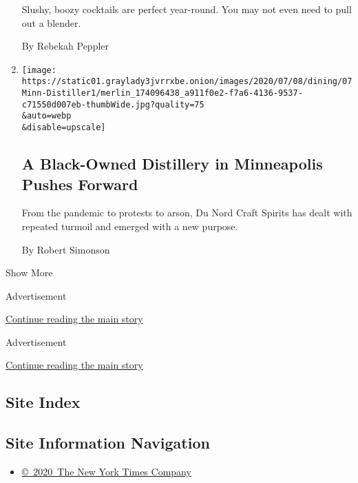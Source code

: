\begin{enumerate}
  Slushy, boozy cocktails are perfect year-round. You may not even need
  to pull out a blender.

  By Rebekah Peppler
\item
  \href{/2020/07/07/dining/drinks/du-nord-black-owned-distillery-minneapolis.html}{}

  \texttt{[image: https://static01.graylady3jvrrxbe.onion/images/2020/07/08/dining/07Minn-Distiller1/merlin\_174096438\_a911f0e2-f7a6-4136-9537-c71550d007eb-thumbWide.jpg?quality=75\\\&auto=webp\\\&disable=upscale]}

  \hypertarget{a-black-owned-distillery-in-minneapolis-pushes-forward}{%
  \subsection{A Black-Owned Distillery in Minneapolis Pushes
  Forward}\label{a-black-owned-distillery-in-minneapolis-pushes-forward}}

  From the pandemic to protests to arson, Du Nord Craft Spirits has
  dealt with repeated turmoil and emerged with a new purpose.

  By Robert Simonson
\end{enumerate}

Show More

Advertisement

\protect\hyperlink{after-mid2}{Continue reading the main story}

Advertisement

\protect\hyperlink{after-mktg}{Continue reading the main story}

\hypertarget{site-index}{%
\subsection{Site Index}\label{site-index}}

\hypertarget{site-information-navigation}{%
\subsection{Site Information
Navigation}\label{site-information-navigation}}

\begin{itemize}
\tightlist
\item
  \href{https://help.nytimes3xbfgragh.onion/hc/en-us/articles/115014792127-Copyright-notice}{©~2020~The
  New York Times Company}
\end{itemize}

